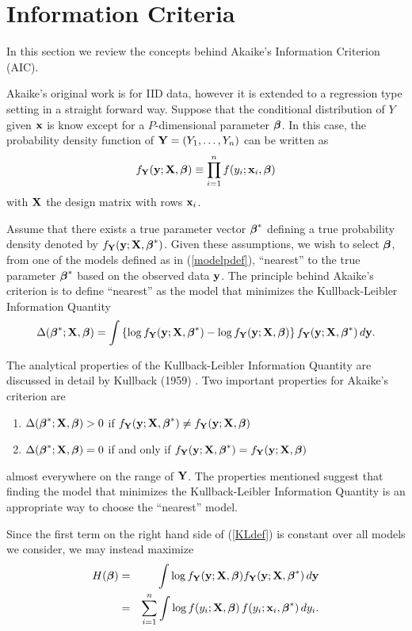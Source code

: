 \section{Information Criteria}
In this section we review the concepts behind 
Akaike's Information Criterion (AIC).

Akaike's original work is for
IID data, however it is extended to a regression type setting in a
straight forward way. Suppose that the conditional distribution of $Y$
given ${\mathbf x}$ is know except for a $P$-dimensional parameter $\mbox{\boldmath $\beta$\unboldmath}$. In
this case,  the probability density function of ${\mathbf Y} =
(Y_1,\dots,Y_n)$ can be written as 
\begin{equation}
\label{parsimodel}
f_{\bY}(\by;\bX,\bb) \equiv \prod_{i=1}^n f(y_i;\bx_i,\bb)
\end{equation}
with ${\mathbf X}$ the design matrix with rows ${\mathbf x}_i$. 

Assume that
there exists a true parameter vector $\mbox{\boldmath $\beta$\unboldmath}^*$ defining a true
probability density denoted by
$f_{{\mathbf Y}}({\mathbf y};{\mathbf X},\mbox{\boldmath $\beta$\unboldmath}^*)$. Given these assumptions, we wish to select
$\mbox{\boldmath $\beta$\unboldmath}$, from one of the models 
defined as in (\ref{modelpdef}), ``nearest'' to the true
parameter $\mbox{\boldmath $\beta$\unboldmath}^*$ based on the observed data ${\mathbf y}$.
The principle behind Akaike's criterion is to
define ``nearest'' as the model that minimizes the Kullback-Leibler 
Information Quantity
\begin{equation}
\label{KLdef} 
\Delta(\bb^*;\bX,\bb) = \int \left\{\log
  f_\bY(\by;\bX,\bb^*) - \log
  f_\bY(\by;\bX,\bb)\right\} f_{\bY}(\by;\bX,\bb^*) \, d\by.
\end{equation}

The analytical properties of the Kullback-Leibler Information Quantity
are discussed in detail by Kullback (1959) \nocite{kull:1959}. Two
important properties 
for Akaike's criterion are
\begin{enumerate}
\item $\Delta(\mbox{\boldmath $\beta$\unboldmath}^*;{\mathbf X},\mbox{\boldmath $\beta$\unboldmath}) > 0$ if 
$f_{{\mathbf Y}}({\mathbf y};{\mathbf X},\mbox{\boldmath $\beta$\unboldmath}^*) \neq f_{{\mathbf Y}}({\mathbf y};{\mathbf X},\mbox{\boldmath $\beta$\unboldmath})$
\item
$\Delta(\mbox{\boldmath $\beta$\unboldmath}^*;{\mathbf X},\mbox{\boldmath $\beta$\unboldmath}) = 0$  if and only if $f_{{\mathbf Y}}({\mathbf y};{\mathbf X},\mbox{\boldmath $\beta$\unboldmath}^*) =
f_{{\mathbf Y}}({\mathbf y};{\mathbf X},\mbox{\boldmath $\beta$\unboldmath})$ 
\end{enumerate}
almost everywhere on the range of ${\mathbf Y}$. 
The properties
mentioned suggest that finding the model that 
minimizes the Kullback-Leibler 
Information Quantity is an appropriate way to choose the ``nearest''
model.

Since the first term on the
right hand side of 
(\ref{KLdef}) is constant over all models we consider, we may instead
maximize
\begin{eqnarray}
\nonumber
H(\bb) &=& \int \log
  f_\bY(\by;\bX,\bb) f_{\bY}(\by;\bX,\bb^*) \, d\by\\
\label{Hdef}
&=& \sum_{i=1}^n \int \log f(y_i;\bX,\bb) \, f(y_i;\bx_i,\bb^*) \, dy_i.
\end{eqnarray}

